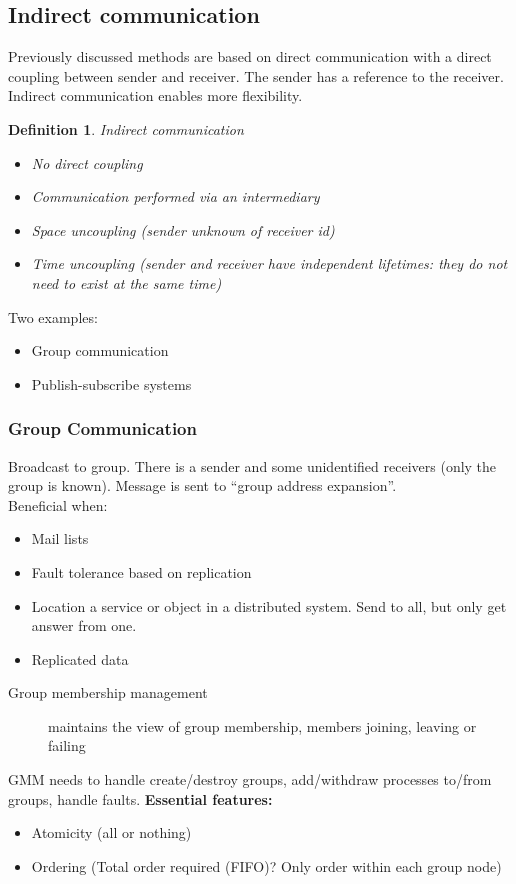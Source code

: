 \documentclass[a4paper]{article}
\newtheorem{definition}{Definition}
\begin{document}
\subsection{Indirect communication}
Previously discussed methods are based on direct communication with a direct
coupling between sender and receiver. The sender has a reference to the
receiver. Indirect communication enables more flexibility.
\\
\begin{definition}
	Indirect communication\\
\begin{itemize}
	\item No direct coupling
	\item Communication performed via an intermediary
	\item Space uncoupling (sender unknown of receiver id)
	\item Time uncoupling (sender and receiver have independent lifetimes:
		they do not need to exist at the same time)
\end{itemize}
\end{definition}
Two examples:
\begin{itemize}
	\item Group communication
	\item Publish-subscribe systems
\end{itemize}
\subsubsection{Group Communication}
Broadcast to group. There is a sender and some unidentified receivers (only the
group is known). Message is sent  to ``group address expansion''.\\
Beneficial when:
\begin{itemize}
	\item Mail lists
	\item Fault tolerance based on replication
	\item Location a service or object in a distributed system. Send to all,
		but only get answer from one.
	\item Replicated data
\end{itemize}

\begin{description}
	\item[Group membership management] maintains the view of group
		membership, members joining, leaving or failing
\end{description}
GMM needs to handle create/destroy groups, add/withdraw processes to/from
groups, handle faults.
\textbf{Essential features:}
\begin{itemize}
	\item Atomicity (all or nothing)
	\item Ordering (Total order required (FIFO)? Only order within each
		group node)
\end{itemize}
\end{document}
